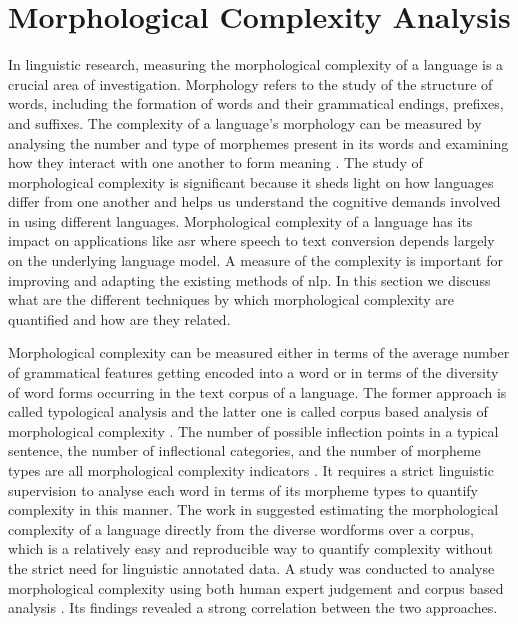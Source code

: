\section{Morphological Complexity Analysis}
\label{sec:Literaure-morphcomplexity}

In linguistic research, measuring the morphological complexity of a language  is a crucial area of investigation. Morphology refers to the study of the structure of words, including the formation of words and their grammatical endings, prefixes, and suffixes. The complexity of a language's morphology can be measured by analysing the number and type of morphemes present in its words and examining how they interact with one another to form meaning \cite{bane2008quantifying}. The study of morphological complexity is significant because it sheds light on how languages differ from one another and helps us understand the cognitive demands involved in using different languages. Morphological complexity of a language has its impact on applications like \gls{asr} where speech to text conversion depends largely on the underlying language model. A measure of the complexity is important for improving and adapting the existing methods of \gls{nlp}\cite{gutierrez2018comparing}. In this section we discuss what are the different techniques by which morphological complexity are quantified and how are they related.

Morphological complexity can be measured either in terms of the average number of grammatical features getting encoded into a word or in terms of the diversity of word forms occurring in the text corpus of a language. The former approach is called typological analysis and the latter one is called corpus based analysis of morphological complexity \cite{bentz2016comparison}. The number of possible inflection points in a typical sentence, the number of
inflectional categories, and the number of morpheme types are all morphological
complexity indicators \cite{bane2008quantifying}. It requires a strict linguistic supervision to analyse each word in terms of its morpheme types to quantify complexity in this manner. The work in \cite{gutierrez2018comparing} suggested estimating the morphological complexity of a language directly from the diverse wordforms over a corpus, which is a relatively easy and reproducible way to quantify complexity without the strict need for linguistic annotated data. A study was conducted to analyse morphological complexity using both human expert judgement and corpus based analysis \cite{bentz2016comparison}. Its findings revealed a strong correlation between the two approaches.


